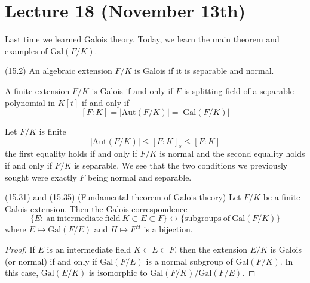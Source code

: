 \section{Lecture 18 (November 13th)}
\begin{rmk}
Last time we learned Galois theory. Today, we learn the main theorem and examples of $\mathrm{Gal}(F/K)$. 
\end{rmk}
\vspace{2ex}
\begin{defi}
(15.2) An algebraic extension $F/K$ is Galois if it is separable and normal.
\end{defi}
\vspace{2ex}
\begin{rmk}
A finite extension $F/K$ is Galois if and only if $F$ is splitting field of a separable polynomial in $K[t]$ if and only if 
\[[F:K]=|\mathrm{Aut}(F/K)|=|\mathrm{Gal}(F/K)|\]
\end{rmk}
\vspace{2ex}
\begin{rmk}
Let $F/K$ is finite
\[|\mathrm{Aut}(F/K)|\leq [F:K]_{s}\leq [F:K]\]
the first equality holds if and only if $F/K$ is normal and the second equality holds if and only if $F/K$ is separable. We see that the two conditions we previously sought were exactly $F$ being normal and separable. 
\end{rmk}
\vspace{2ex}
\begin{thm}
(15.31) and (15.35) (Fundamental theorem of Galois theory) Let $F/K$ be a finite Galois extension. Then the Galois correspondence
\[\{E:\mathrm{\ an\ intermediate\ field\ }K\subset E\subset F\}\longleftrightarrow \{\mathrm{ subgroups\ of\ }\mathrm{Gal}(F/K)\}\]
where $E\mapsto \mathrm{Gal}(F/E)$ and $H\mapsto F^{H}$ is a bijection.
\end{thm}
\vspace{2ex}
\begin{proof}
If $E$ is an intermediate field $K\subset E\subset F$, then the extension $E/K$ is Galois (or normal) if and only if $\mathrm{Gal}(F/E)$ is a normal subgroup of $\mathrm{Gal}(F/K)$. In this case, $\mathrm{Gal}(E/K)$ is isomorphic to $\mathrm{Gal}(F/K)/\mathrm{Gal}(F/E)$.
\end{proof}
\vspace{2ex}
